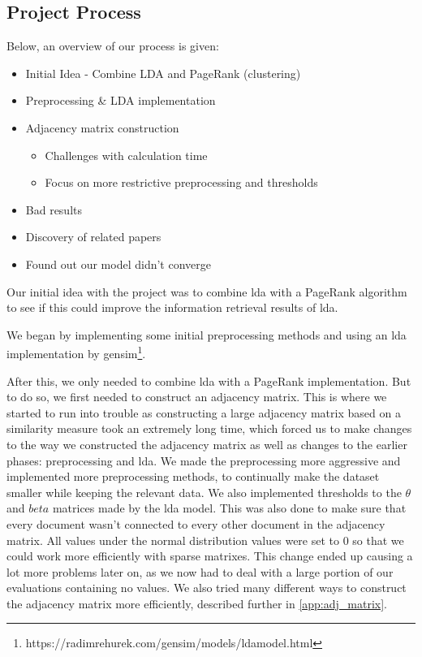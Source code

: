 \subsection{Project Process}
Below, an overview of our process is given:
\begin{itemize}
	\item Initial Idea - Combine LDA and PageRank (clustering)
	\item Preprocessing \& LDA implementation
	\item Adjacency matrix construction
	\begin{itemize}
		\item Challenges with calculation time
		\item Focus on more restrictive preprocessing and thresholds
	\end{itemize}
	\item Bad results
	\item Discovery of related papers
	\item Found out our model didn't converge
\end{itemize}

Our initial idea with the project was to combine \gls{lda} with a PageRank algorithm to see if this could improve the information retrieval results of \gls{lda}.

We began by implementing some initial preprocessing methods and using an \gls{lda} implementation by gensim\footnote{https://radimrehurek.com/gensim/models/ldamodel.html}.

After this, we only needed to combine \gls{lda} with a PageRank implementation. 
But to do so, we first needed to construct an adjacency matrix. 
This is where we started to run into trouble as constructing a large adjacency matrix based on a similarity measure took an extremely long time, which forced us to make changes to the way we constructed the adjacency matrix as well as changes to the earlier phases: preprocessing and \gls{lda}.
We made the preprocessing more aggressive and implemented more preprocessing methods, to continually make the dataset smaller while keeping the relevant data.
We also implemented thresholds to the $\theta$ and $beta$ matrices made by the \gls{lda} model.
This was also done to make sure that every document wasn't connected to every other document in the adjacency matrix.
All values under the normal distribution values were set to 0 so that we could work more efficiently with sparse matrixes.
This change ended up causing a lot more problems later on, as we now had to deal with a large portion of our evaluations containing no values. 
We also tried many different ways to construct the adjacency matrix more efficiently, described further in \autoref{app:adj_matrix}.

